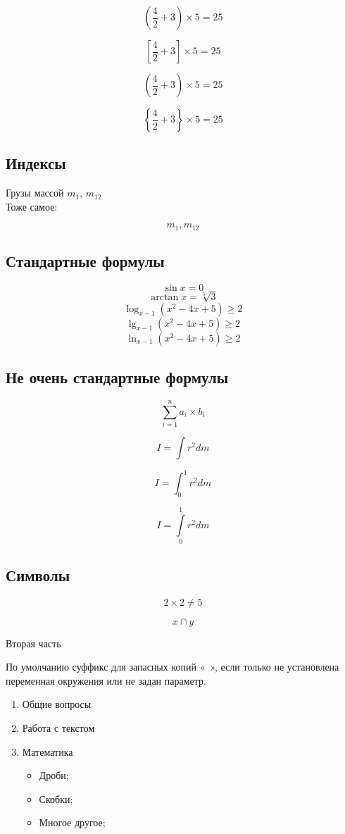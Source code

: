 \documentclass[a4paper,12pt]{article}
\begin{document}
\[ (\frac{4}{2}+3)\times 5=25 \]

\[ \left[\frac{4}{2}+3\right]\times 5 =25 \]

\[ \left(\frac{4}{2}+3\right)\times 5 =25 \]

\[ \left\{\frac{4}{2}+3\right\}\times 5 =25 \]


\subsection{Индексы}

Грузы массой $m_1$, $m_{12}$ \\
Тоже самое:

\[ m_1, m_{12} \]

\subsection{Стандартные формулы}

\[ \sin x=0 \]
\[ \arctan x=\sqrt[5]{3} \]
\[ \log_{x-1}{(x^2-4x+5)} \geqslant 2\]
\[ \lg_{x-1}{(x^2-4x+5)} \geqslant 2\]
\[ \ln_{x-1}{(x^2-4x+5)} \geqslant 2\]

\subsection{Не очень стандартные формулы}

\[\sum_{i=1}^{n}a_i \times b_i \]

\[I = \int r^2dm \]

\[I = \int_{0}^{1} r^2dm \]

\[I = \int\limits_{0}^{1} r^2dm \]

\subsection{Символы}

\[2\times 2\neq 5 \]

\[x \cap y \]


\newpage

\begin{center}
Вторая часть
\end{center}



\begin{flushright}
По умолчанию суффикс для запасных копий «~», если только не установлена
переменная окружения или не задан параметр.
\end{flushright}


\begin{enumerate}

\item Общие вопросы
\item Работа с текстом 
\item Математика

\begin{itemize}
\item Дроби;
\item Скобки;
\item Многое другое;
\end{itemize}

\end{enumerate}
\end{document}
